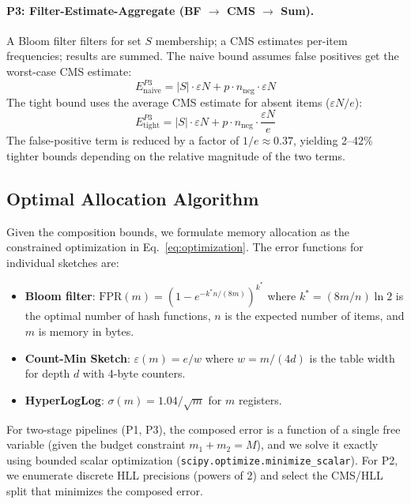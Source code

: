 \documentclass[preprint]{article}
\newcommand{\fpr}{\textrm{FPR}}
\begin{document}
\paragraph{P3: Filter-Estimate-Aggregate (BF $\to$ CMS $\to$ Sum).}
A Bloom filter filters for set $S$ membership; a CMS estimates per-item frequencies; results are summed. The naive bound assumes false positives get the worst-case CMS estimate:
\begin{equation}
E_{\text{naive}}^{P3} = |S| \cdot \varepsilon N + p \cdot n_{\text{neg}} \cdot \varepsilon N
\end{equation}
The tight bound uses the average CMS estimate for absent items ($\varepsilon N / e$):
\begin{equation}
\label{eq:p3_tight}
E_{\text{tight}}^{P3} = |S| \cdot \varepsilon N + p \cdot n_{\text{neg}} \cdot \frac{\varepsilon N}{e}
\end{equation}
The false-positive term is reduced by a factor of $1/e \approx 0.37$, yielding 2--42\% tighter bounds depending on the relative magnitude of the two terms.

\subsection{Optimal Allocation Algorithm}

Given the composition bounds, we formulate memory allocation as the constrained optimization in Eq.~\ref{eq:optimization}. The error functions for individual sketches are:
\begin{itemize}
    \item \textbf{Bloom filter}: $\fpr(m) = (1 - e^{-k^* n / (8m)})^{k^*}$ where $k^* = (8m/n) \ln 2$ is the optimal number of hash functions, $n$ is the expected number of items, and $m$ is memory in bytes.
    \item \textbf{Count-Min Sketch}: $\varepsilon(m) = e / w$ where $w = m/(4d)$ is the table width for depth $d$ with 4-byte counters.
    \item \textbf{HyperLogLog}: $\sigma(m) = 1.04/\sqrt{m}$ for $m$ registers.
\end{itemize}

For two-stage pipelines (P1, P3), the composed error is a function of a single free variable (given the budget constraint $m_1 + m_2 = M$), and we solve it exactly using bounded scalar optimization (\texttt{scipy.optimize.minimize\_scalar}). For P2, we enumerate discrete HLL precisions (powers of 2) and select the CMS/HLL split that minimizes the composed error.
\end{document}
